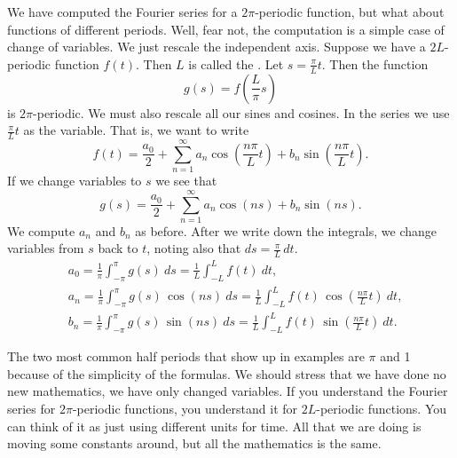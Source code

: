 We have computed the Fourier series for a $2\pi$-periodic function, but what
about functions of different periods.  Well, fear not, the computation is a
simple case of change of variables.  We just rescale the independent
axis.  Suppose we have a $2L$-periodic function $f(t)$.  Then $L$ is called
the \emph{}.  Let $s = \frac{\pi}{L}  t$.
Then the function
\begin{equation*}
g(s) = f\left(\frac{L}{\pi} s \right)
\end{equation*}
is $2\pi$-periodic.  We must also rescale all our sines and cosines.
In the series we use $\frac{\pi}{L} t$ as the variable.  That is, we
want to write
\begin{equation*}
\boxed{~~
f(t) = 
\frac{a_0}{2} +
\sum_{n=1}^\infty a_n \cos \left( \frac{n \pi}{L} t \right)
+ b_n \sin \left(\frac{n \pi}{L} t \right) .
~~}
\end{equation*}
If we change variables to $s$ we see that
\begin{equation*}
g(s) = 
\frac{a_0}{2} +
\sum_{n=1}^\infty a_n \cos (n s)
+ b_n \sin (n s) .
\end{equation*}
We compute $a_n$ and $b_n$ as before.  After we write down the
integrals, we change variables from $s$ back to $t$, noting also
that $ds = \frac{\pi}{L} \, dt$.
\begin{equation*}
\boxed{~~
\begin{aligned}
& a_0 =
\frac{1}{\pi}
\int_{-\pi}^\pi
g(s) ~ ds
=
\frac{1}{L}
\int_{-L}^L
f(t) ~ dt , \\
& a_n =
\frac{1}{\pi}
\int_{-\pi}^\pi
g(s) \, \cos (n s) ~ ds
=
\frac{1}{L}
\int_{-L}^L
f(t) \, \cos \left( \frac{n \pi}{L} t \right) ~ dt , \\
& b_n =
\frac{1}{\pi}
\int_{-\pi}^\pi
g(s) \, \sin (n s) ~ ds
=
\frac{1}{L}
\int_{-L}^L
f(t) \, \sin \left( \frac{n \pi}{L} t \right) ~ dt .
\end{aligned}
~~}
\end{equation*}

The two most common half periods that show up in examples
are $\pi$ and 1 because of the simplicity of the formulas.  We should stress that we have
done no new mathematics, we have only changed variables.  If you understand 
the Fourier series for $2\pi$-periodic functions, you understand it for
$2L$-periodic functions.  You can think of it as just using
different units for time.  All that we are doing is moving some constants
around, but all the mathematics is the same.

